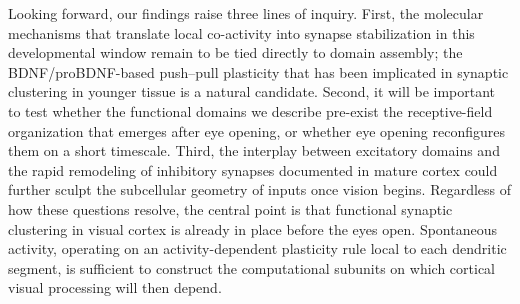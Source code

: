 \documentclass[11pt]{article}
\begin{document}
Looking forward, our findings raise three lines of inquiry. First, the molecular mechanisms that translate local co-activity into synapse stabilization in this developmental window remain to be tied directly to domain assembly; the BDNF/proBDNF-based push--pull plasticity that has been implicated in synaptic clustering in younger tissue \citep{winnubst2012synaptic} is a natural candidate. Second, it will be important to test whether the functional domains we describe pre-exist the receptive-field organization that emerges after eye opening, or whether eye opening reconfigures them on a short timescale. Third, the interplay between excitatory domains and the rapid remodeling of inhibitory synapses documented in mature cortex \citep{villa2016inhibitory} could further sculpt the subcellular geometry of inputs once vision begins. Regardless of how these questions resolve, the central point is that functional synaptic clustering in visual cortex is already in place before the eyes open. Spontaneous activity, operating on an activity-dependent plasticity rule local to each dendritic segment, is sufficient to construct the computational subunits on which cortical visual processing will then depend.



\end{document}
